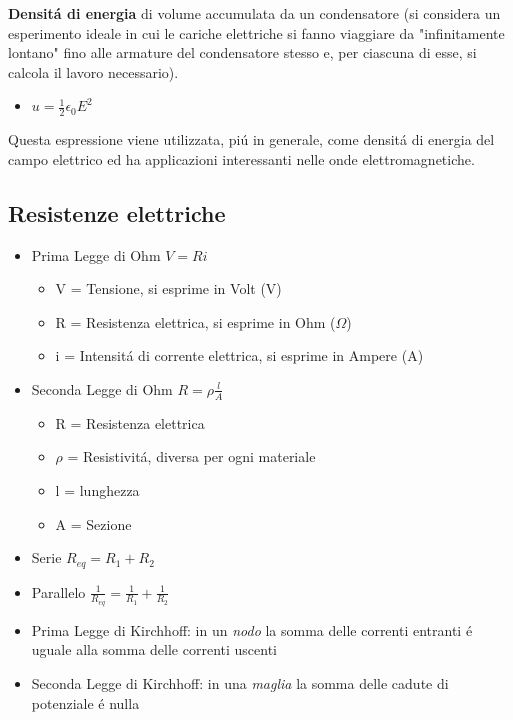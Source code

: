 \documentclass[17pt]{extarticle}
\begin{document}
{\bf Densit\'a di energia} di volume accumulata da un condensatore (si considera un esperimento ideale in cui le cariche elettriche si fanno viaggiare da "infinitamente lontano" fino alle armature del condensatore stesso e, per ciascuna di esse, si calcola il lavoro necessario).

\begin{itemize}
	\item $u = \frac{1}{2} \epsilon_0E^2$
\end{itemize}

Questa espressione viene utilizzata, pi\'u in generale, come densit\'a di energia del campo elettrico ed ha applicazioni interessanti nelle onde elettromagnetiche.

\subsection{Resistenze elettriche}

\begin{itemize}
	\item Prima Legge di Ohm $V = Ri$
		\begin{itemize}
			\item V = Tensione, si esprime in Volt (V)
			\item R = Resistenza elettrica, si esprime in Ohm ($\Omega$)
			\item i = Intensit\'a di corrente elettrica, si esprime in Ampere (A)
		\end{itemize}
	\item Seconda Legge di Ohm $R=\rho\frac{l}{A}$
		\begin{itemize}
			\item R = Resistenza elettrica
			\item $\rho$ = Resistivit\'a, diversa per ogni materiale
			\item l = lunghezza
			\item A = Sezione
		\end{itemize}
	\item Serie $R_{eq} = R_1 + R_2$
	\item Parallelo $\frac{1}{R_{eq}} = \frac{1}{R_1} + \frac{1}{R_2}$
	\item Prima Legge di Kirchhoff: in un \emph{nodo} la somma delle correnti entranti \'e uguale alla somma delle correnti uscenti
	\item Seconda Legge di Kirchhoff: in una \emph{maglia} la somma delle cadute di potenziale \'e nulla
\end{itemize}
\end{document}
